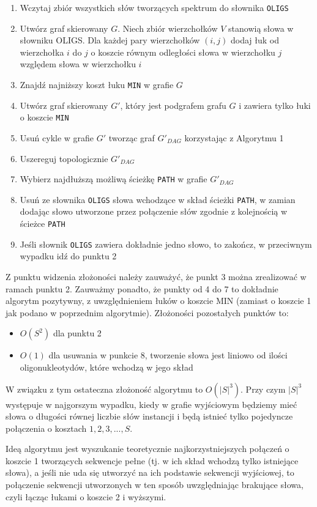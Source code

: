 \documentclass[a4paper,10pt]{article}
\begin{document}
\begin{enumerate}
 \item Wczytaj zbiór wszystkich słów tworzących spektrum do słownika \texttt{OLIGS}
 \item Utwórz graf skierowany $G$. Niech zbiór wierzchołków $V$ stanowią słowa w słowniku OLIGS. Dla każdej pary wierzchołków $(i,j)$ dodaj 
       łuk od wierzchołka $i$ do $j$ o koszcie równym odległości słowa w wierzchołku $j$ względem słowa w wierzchołku $i$
 \item Znajdź najniższy koszt łuku \texttt{MIN} w grafie $G$
 \item Utwórz graf skierowany $G'$, który jest podgrafem grafu $G$ i zawiera tylko łuki o koszcie \texttt{MIN}
 \item Usuń cykle w grafie $G'$ tworząc graf $G'_{DAG}$ korzystając z Algorytmu 1
 \item Uszereguj topologicznie $G'_{DAG}$
 \item Wybierz najdłuższą możliwą ścieżkę \texttt{PATH} w grafie $G'_{DAG}$
 \item Usuń ze słownika \texttt{OLIGS} słowa wchodzące w skład ścieżki \texttt{PATH}, w zamian dodając słowo utworzone przez połączenie słów zgodnie z kolejnością w ścieżce \texttt{PATH}
 \item Jeśli słownik \texttt{OLIGS} zawiera dokładnie jedno słowo, to zakończ, w przeciwnym wypadku idź do punktu 2
\end{enumerate}

Z punktu widzenia złożoności należy zauważyć, że punkt 3 można zrealizować w ramach punktu 2. Zauważmy ponadto, że punkty od 4 do 7 to dokładnie algorytm pozytywny, 
z uwzględnieniem łuków o koszcie MIN (zamiast o koszcie 1 jak podano w poprzednim algorytmie). Złożoności pozostałych punktów to:
\begin{itemize}
 \item $O(S^2)$ dla punktu 2
 \item $O(1)$ dla usuwania w punkcie 8, tworzenie słowa jest liniowo od ilości oligonukleotydów, które wchodzą w jego skład
\end{itemize}
W związku z tym ostateczna złożoność algorytmu to $O(|S|^3)$. Przy czym $|S|^3$ występuje w najgorszym wypadku, 
kiedy w grafie wyjściowym będziemy mieć słowa o długości równej liczbie słów instancji i będą istnieć tylko pojedyncze połączenia o kosztach $1, 2, 3, ..., S$.

Ideą algorytmu jest wyszukanie teoretycznie najkorzystniejszych połączeń o koszcie 1 tworzących sekwencje 
pełne (tj. w ich skład wchodzą tylko istniejące słowa), a jeśli nie uda się utworzyć na ich podstawie sekwencji wyjściowej, 
to połączenie sekwencji utworzonych w ten sposób uwzględniając brakujące słowa, czyli łącząc łukami o koszcie 2 i wyższymi. 
\end{document}
